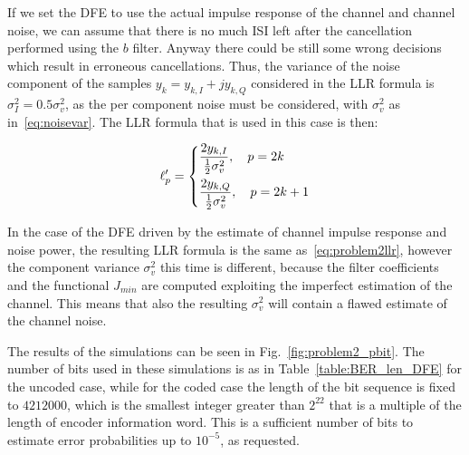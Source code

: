 \documentclass[10pt]{article}
\begin{document}
If we set the DFE to use the actual impulse response of the channel and channel noise, we can assume that there is no much ISI left after the cancellation performed using the $b$ filter. Anyway there could be still some wrong decisions which result in erroneous cancellations. Thus, the variance of the noise component of the samples $y_k = y_{k,I} + j y_{k,Q}$ considered in the LLR formula is $\sigma_I^2 = 0.5 \sigma_v^2$, as the per component noise must be considered, with $\sigma_v^2$ as in~\eqref{eq:noisevar}. The LLR formula that is used in this case is then:

\begin{equation}
	\ell'_p =
	\begin{dcases}
	\frac{2 y_{k,I}}{\frac{1}{2} \sigma_v^2}, \quad p = 2k \\
	\frac{2 y_{k,Q}}{\frac{1}{2} \sigma_v^2}, \quad p = 2k +1
	\end{dcases}
	\label{eq:problem2llr}
\end{equation}

In the case of the DFE driven by the estimate of channel impulse response and noise power, the resulting LLR formula is the same as~\eqref{eq:problem2llr}, however the component variance $\sigma_v^2$ this time is different, because the filter coefficients and the functional $J_{min}$ are computed exploiting the imperfect estimation of the channel. This means that also the resulting $\sigma_v^2$ will contain a flawed estimate of the channel noise. 

The results of the simulations can be seen in Fig.~\ref{fig:problem2_pbit}. The number of bits used in these simulations is as in Table~\ref{table:BER_len_DFE} for the uncoded case, while for the coded case the length of the bit sequence is fixed to $4212000$, which is the smallest integer greater than $2^{22}$ that is a multiple of the length of encoder information word. This is a sufficient number of bits to estimate error probabilities up to $10^{-5}$, as requested.
\end{document}
